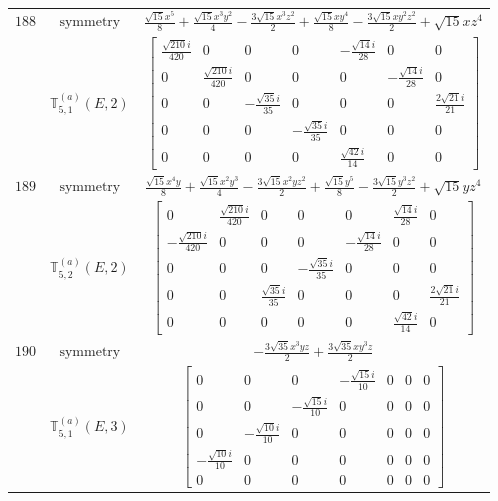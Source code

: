\documentclass[fleqn,8pt,landscape]{jsarticle}
\begin{document}
\begin{longtable}{ccc}
$ 188 $ & $ \text{symmetry} $ & $ \frac{\sqrt{15} x^{5}}{8} + \frac{\sqrt{15} x^{3} y^{2}}{4} - \frac{3 \sqrt{15} x^{3} z^{2}}{2} + \frac{\sqrt{15} x y^{4}}{8} - \frac{3 \sqrt{15} x y^{2} z^{2}}{2} + \sqrt{15} x z^{4} $ \\
$  $ & $ \mathbb{T}_{5,1}^{(a)}(E,2) $ & $ \begin{bmatrix} \frac{\sqrt{210} i}{420} & 0 & 0 & 0 & - \frac{\sqrt{14} i}{28} & 0 & 0 \\ 0 & \frac{\sqrt{210} i}{420} & 0 & 0 & 0 & - \frac{\sqrt{14} i}{28} & 0 \\ 0 & 0 & - \frac{\sqrt{35} i}{35} & 0 & 0 & 0 & \frac{2 \sqrt{21} i}{21} \\ 0 & 0 & 0 & - \frac{\sqrt{35} i}{35} & 0 & 0 & 0 \\ 0 & 0 & 0 & 0 & \frac{\sqrt{42} i}{14} & 0 & 0 \end{bmatrix} $ \\ \hline
$ 189 $ & $ \text{symmetry} $ & $ \frac{\sqrt{15} x^{4} y}{8} + \frac{\sqrt{15} x^{2} y^{3}}{4} - \frac{3 \sqrt{15} x^{2} y z^{2}}{2} + \frac{\sqrt{15} y^{5}}{8} - \frac{3 \sqrt{15} y^{3} z^{2}}{2} + \sqrt{15} y z^{4} $ \\
$  $ & $ \mathbb{T}_{5,2}^{(a)}(E,2) $ & $ \begin{bmatrix} 0 & \frac{\sqrt{210} i}{420} & 0 & 0 & 0 & \frac{\sqrt{14} i}{28} & 0 \\ - \frac{\sqrt{210} i}{420} & 0 & 0 & 0 & - \frac{\sqrt{14} i}{28} & 0 & 0 \\ 0 & 0 & 0 & - \frac{\sqrt{35} i}{35} & 0 & 0 & 0 \\ 0 & 0 & \frac{\sqrt{35} i}{35} & 0 & 0 & 0 & \frac{2 \sqrt{21} i}{21} \\ 0 & 0 & 0 & 0 & 0 & \frac{\sqrt{42} i}{14} & 0 \end{bmatrix} $ \\ \hline
$ 190 $ & $ \text{symmetry} $ & $ - \frac{3 \sqrt{35} x^{3} y z}{2} + \frac{3 \sqrt{35} x y^{3} z}{2} $ \\
$  $ & $ \mathbb{T}_{5,1}^{(a)}(E,3) $ & $ \begin{bmatrix} 0 & 0 & 0 & - \frac{\sqrt{15} i}{10} & 0 & 0 & 0 \\ 0 & 0 & - \frac{\sqrt{15} i}{10} & 0 & 0 & 0 & 0 \\ 0 & - \frac{\sqrt{10} i}{10} & 0 & 0 & 0 & 0 & 0 \\ - \frac{\sqrt{10} i}{10} & 0 & 0 & 0 & 0 & 0 & 0 \\ 0 & 0 & 0 & 0 & 0 & 0 & 0 \end{bmatrix} $ \\ \hline

\end{longtable}
\end{document}

